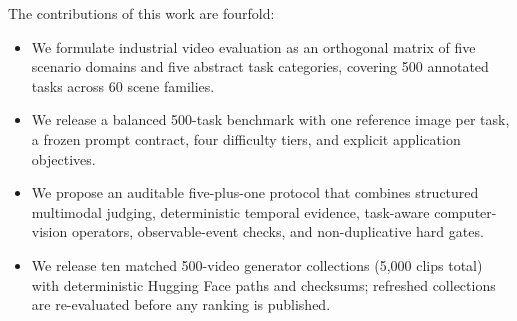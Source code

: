The contributions of this work are fourfold:
\begin{itemize}[leftmargin=*]
    \item We formulate industrial video evaluation as an orthogonal matrix of five scenario domains and five abstract task categories, covering 500 annotated tasks across 60 scene families.
    \item We release a balanced 500-task benchmark with one reference image per task, a frozen prompt contract, four difficulty tiers, and explicit application objectives.
    \item We propose an auditable five-plus-one protocol that combines structured multimodal judging, deterministic temporal evidence, task-aware computer-vision operators, observable-event checks, and non-duplicative hard gates.
    \item We release ten matched 500-video generator collections (5,000 clips total) with deterministic Hugging Face paths and checksums; refreshed collections are re-evaluated before any ranking is published.
\end{itemize}
